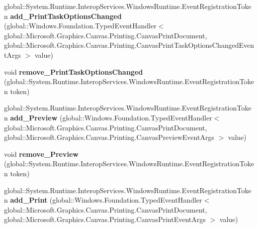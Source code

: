 \begin{DoxyCompactItemize}
\mbox{\label{class_microsoft_1_1_graphics_1_1_canvas_1_1_printing_1_1_canvas_print_document_a5820ace78b04e0ce349872d83c3d7006}} 
global\+::\+System.\+Runtime.\+Interop\+Services.\+Windows\+Runtime.\+Event\+Registration\+Token {\bfseries add\+\_\+\+Print\+Task\+Options\+Changed} (global\+::\+Windows.\+Foundation.\+Typed\+Event\+Handler$<$ global\+::\+Microsoft.\+Graphics.\+Canvas.\+Printing.\+Canvas\+Print\+Document, global\+::\+Microsoft.\+Graphics.\+Canvas.\+Printing.\+Canvas\+Print\+Task\+Options\+Changed\+Event\+Args $>$ value)
\item 
\mbox{\label{class_microsoft_1_1_graphics_1_1_canvas_1_1_printing_1_1_canvas_print_document_a0de28697a340eecb4f4b11addd897850}} 
void {\bfseries remove\+\_\+\+Print\+Task\+Options\+Changed} (global\+::\+System.\+Runtime.\+Interop\+Services.\+Windows\+Runtime.\+Event\+Registration\+Token token)
\item 
\mbox{\label{class_microsoft_1_1_graphics_1_1_canvas_1_1_printing_1_1_canvas_print_document_a27f47fca50c0e59ac08d765c11296386}} 
global\+::\+System.\+Runtime.\+Interop\+Services.\+Windows\+Runtime.\+Event\+Registration\+Token {\bfseries add\+\_\+\+Preview} (global\+::\+Windows.\+Foundation.\+Typed\+Event\+Handler$<$ global\+::\+Microsoft.\+Graphics.\+Canvas.\+Printing.\+Canvas\+Print\+Document, global\+::\+Microsoft.\+Graphics.\+Canvas.\+Printing.\+Canvas\+Preview\+Event\+Args $>$ value)
\item 
\mbox{\label{class_microsoft_1_1_graphics_1_1_canvas_1_1_printing_1_1_canvas_print_document_aa7beedc13a3a13307163655bbab18019}} 
void {\bfseries remove\+\_\+\+Preview} (global\+::\+System.\+Runtime.\+Interop\+Services.\+Windows\+Runtime.\+Event\+Registration\+Token token)
\item 
\mbox{\label{class_microsoft_1_1_graphics_1_1_canvas_1_1_printing_1_1_canvas_print_document_a9da3eaf71e29837bb52c49b799a88293}} 
global\+::\+System.\+Runtime.\+Interop\+Services.\+Windows\+Runtime.\+Event\+Registration\+Token {\bfseries add\+\_\+\+Print} (global\+::\+Windows.\+Foundation.\+Typed\+Event\+Handler$<$ global\+::\+Microsoft.\+Graphics.\+Canvas.\+Printing.\+Canvas\+Print\+Document, global\+::\+Microsoft.\+Graphics.\+Canvas.\+Printing.\+Canvas\+Print\+Event\+Args $>$ value)

\end{DoxyCompactItemize}
